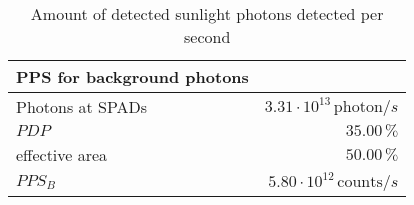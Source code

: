 \begin{table}[H]
\centering
\caption{Amount of detected sunlight photons detected per second}
\label{tab:PPS}
\begin{tabular}{|l|r|}\hline
    \textbf{PPS for background photons} & \\
    \hline 
    Photons at SPADs & $3.31\cdot10^{13}\,\text{photon}/s$ \\
    $PDP$ & $35.00\, \%$ \\
    effective area & $50.00\, \%$ \\
    $PPS_B$ & $5.80\cdot10^{12}\,\text{counts}/s$ \\
    \hline 
\end{tabular}
\end{table}
